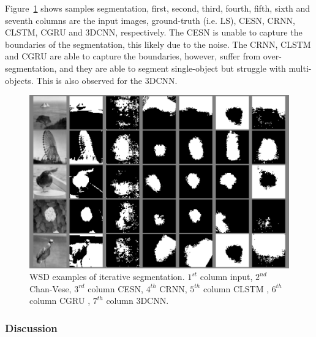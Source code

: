\documentclass{WitsPhysicsReport}
\begin{document}
Figure~\ref{fig:sample_results_weizamann} shows samples segmentation, first, second, third, fourth, fifth, sixth and seventh columns are the input images, ground-truth (i.e. LS), CESN, CRNN, CLSTM, CGRU and 3DCNN, respectively. The CESN is unable to capture the boundaries of the segmentation, this likely due to the noise. The CRNN, CLSTM and CGRU are able to capture the boundaries, however, suffer from over-segmentation, and they are able to segment single-object but struggle with multi-objects. This is also observed for the 3DCNN.

\begin{figure}[H]
\centering
  \includegraphics[width=1\textwidth]{Figure/Results/WEIZMANN_sample.png}
 \caption{WSD examples of iterative segmentation. $1^{st}$ column input, $2^{nd}$ Chan-Vese, $3^{rd}$ column CESN, $4^{th}$ CRNN, $5^{th}$ column CLSTM , $6^{th}$ column CGRU , $7^{th}$ column 3DCNN.}
 \label{fig:sample_results_weizamann}
\end{figure}

\subsubsection{Discussion}
\end{document}
